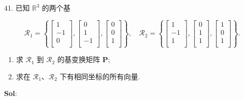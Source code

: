 


41. 已知 $\mathbb{R}^3$ 的两个基

$$
\mathscr{R}_1=\left\{
    \begin{bmatrix}
        1\\-1\\0\\
    \end{bmatrix},
    \begin{bmatrix}
        0\\1\\-1\\
    \end{bmatrix},
    \begin{bmatrix}
        0\\0\\1\\
    \end{bmatrix}
\right\},\quad
\mathscr{R}_2=\left\{
    \begin{bmatrix}
        1\\-1\\1\\
    \end{bmatrix},
    \begin{bmatrix}
        0\\1\\1\\
    \end{bmatrix},
    \begin{bmatrix}
        1\\0\\1\\
    \end{bmatrix}
\right\}.
$$
\begin{enumerate}[(1)]
    \item 求 $\mathscr{R}_1$ 到 $\mathscr{R}_2$ 的基变换矩阵 $\textbf{P}$;
    \item 求在 $\mathscr{R}_1$、$\mathscr{R}_2$ 下有相同坐标的所有向量.
\end{enumerate}


\textbf{Sol}:  

